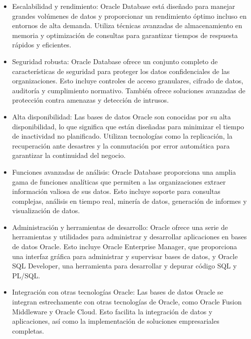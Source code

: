 \documentclass[a4paper, 12pt]{book}
\begin{document}
\begin{itemize}

\item Escalabilidad y rendimiento: Oracle Database está diseñado para manejar grandes volúmenes de datos y proporcionar un rendimiento óptimo incluso en entornos de alta demanda. Utiliza técnicas avanzadas de almacenamiento en memoria y optimización de consultas para garantizar tiempos de respuesta rápidos y eficientes.

\item Seguridad robusta: Oracle Database ofrece un conjunto completo de características de seguridad para proteger los datos confidenciales de las organizaciones. Esto incluye controles de acceso granulares, cifrado de datos, auditoría y cumplimiento normativo. También ofrece soluciones avanzadas de protección contra amenazas y detección de intrusos.

\item Alta disponibilidad: Las bases de datos Oracle son conocidas por su alta disponibilidad, lo que significa que están diseñadas para minimizar el tiempo de inactividad no planificado. Utilizan tecnologías como la replicación, la recuperación ante desastres y la conmutación por error automática para garantizar la continuidad del negocio.

\item Funciones avanzadas de análisis: Oracle Database proporciona una amplia gama de funciones analíticas que permiten a las organizaciones extraer información valiosa de sus datos. Esto incluye soporte para consultas complejas, análisis en tiempo real, minería de datos, generación de informes y visualización de datos.

\item Administración y herramientas de desarrollo: Oracle ofrece una serie de herramientas y utilidades para administrar y desarrollar aplicaciones en bases de datos Oracle. Esto incluye Oracle Enterprise Manager, que proporciona una interfaz gráfica para administrar y supervisar bases de datos, y Oracle SQL Developer, una herramienta para desarrollar y depurar código SQL y PL/SQL.

\item Integración con otras tecnologías Oracle: Las bases de datos Oracle se integran estrechamente con otras tecnologías de Oracle, como Oracle Fusion Middleware y Oracle Cloud. Esto facilita la integración de datos y aplicaciones, así como la implementación de soluciones empresariales completas.
\end{itemize}
\end{document}
